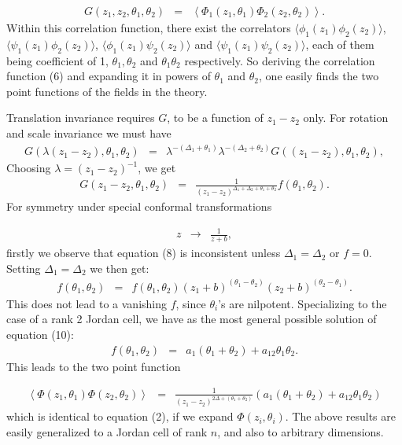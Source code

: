 \documentclass[a4paper,11pt]{article}
\begin{document}
\begin{eqnarray}
G(z_{1},z_{2},\theta_{1},\theta_{2})&=&
\left<\Phi_{1}(z_{1},\theta_{1})\Phi_{2}(z_{2},\theta_{2})\right>
.
\end{eqnarray}
Within this correlation function, there exist the correlators
$\langle \phi_{1}(z_{1}) \phi_{2}(z_{2})\rangle$, $\langle
\psi_{1}(z_{1}) \phi_{2}(z_{2})\rangle$, $\langle \phi_{1}(z_{1})
\psi_{2}(z_{2})\rangle$ and $\langle \psi_{1}(z_{1})
\psi_{2}(z_{2})\rangle$, each of them being coefficient of 1,
$\theta_{1}, \theta_{2}$ and $\theta_{1} \theta_{2}$
respectively. So deriving the correlation function (6) and
expanding it in powers of $\theta_{1}$ and $\theta_{2}$, one
easily finds the two point functions of the fields in the theory.

Translation invariance requires $G$, to be a function
of $z_{1}-z_{2}$ only. For rotation and scale invariance we must have
\begin{eqnarray}
G(\lambda(z_{1}-z_{2}),\theta_{1},\theta_{2})&=&
\lambda^{-(\Delta_{1}+\theta_{1})}\lambda^{-(\Delta_{2}+
\theta_{2})}G((z_{1}-z_{2}),\theta_{1},\theta_{2}) ,
\end{eqnarray}
Choosing $\lambda=(z_{1}-z_{2})^{-1}$, we get
\begin{eqnarray}
G(z_{1}-z_{2},\theta_{1},\theta_{2})&=&
\frac{1}{(z_{1}-z_{2})^{\Delta_{1}+\Delta_{2}+
\theta_{1}+\theta_{2}}}f(\theta_{1},\theta_{2}) .
\end{eqnarray}
For symmetry under special conformal transformations

\begin{eqnarray}
z&\longrightarrow&\frac{1}{z+b} ,
\end{eqnarray}
firstly we observe that equation (8) is inconsistent unless
$\Delta_{1}=\Delta_{2}$ or $f=0$. Setting $\Delta_{1}=\Delta_{2}$
we then get:
\begin{eqnarray}
f(\theta_{1},\theta_{2})&=&f(\theta_{1},\theta_{2})
{(z_{1}+b)}^{(\theta_{1}-\theta_{2})}{(z_{2}+b)}^{(\theta_{2}-\theta_{1})}
.
\end{eqnarray}
This does not lead to a vanishing $f$, since $\theta_{i}$'s are
nilpotent. Specializing to the case of a rank 2 Jordan cell, we
have as the most general possible solution of equation (10):
\begin{eqnarray}
f(\theta_{1},\theta_{2})&=&a_{1}(\theta_{1}+\theta_{2})+a_{12}\theta_{1}\theta_{2}
.
\end{eqnarray}
This leads to the two point function

\begin{eqnarray}
\left<\Phi(z_{1},\theta_{1})\Phi(z_{2},\theta_{2})\right>&=&
\frac{1} {(z_{1}-z_{2})^{2\Delta+(\theta_{1}+\theta_{2})}}
(a_{1}(\theta_{1}+\theta_{2})+a_{12}\theta_{1}\theta_{2})
\end{eqnarray}
which is identical to equation (2), if we expand
$\Phi(z_{i},\theta_{i})$. The above results are easily generalized
to a Jordan cell of rank $n$, and also to arbitrary
dimensions.
\end{document}
